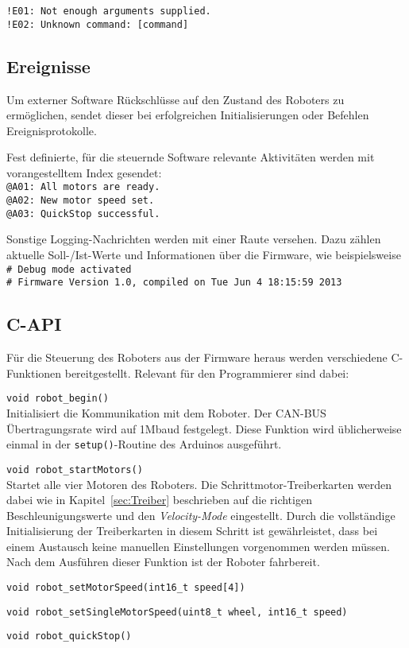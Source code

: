 \lstinline{!E01: Not enough arguments supplied.}\\
\lstinline{!E02: Unknown command: [command]}\\


\subsection{Ereignisse}
Um externer Software Rückschlüsse auf den Zustand des Roboters zu ermöglichen, sendet dieser bei erfolgreichen Initialisierungen oder Befehlen Ereignisprotokolle.

Fest definierte, für die steuernde Software relevante Aktivitäten werden mit vorangestelltem Index gesendet:\\
\lstinline{@A01: All motors are ready.}\\
\lstinline{@A02: New motor speed set.}\\
\lstinline{@A03: QuickStop successful.}

Sonstige Logging-Nachrichten werden mit einer Raute versehen.
Dazu zählen aktuelle Soll-/Ist-Werte und Informationen über die Firmware, wie beispielsweise\\
\lstinline{# Debug mode activated}\\
\lstinline{# Firmware Version 1.0, compiled on Tue Jun 4 18:15:59 2013}


\subsection{C-API}
Für die Steuerung des Roboters aus der Firmware heraus werden verschiedene C-Funktionen bereitgestellt. Relevant für den Programmierer sind dabei:

\begin{description}
\item \lstinline{void robot_begin()} \\
Initialisiert die Kommunikation mit dem Roboter. Der CAN-BUS Übertragungsrate wird auf 1Mbaud festgelegt. Diese Funktion wird üblicherweise einmal in der \lstinline{setup()}-Routine des Arduinos ausgeführt.

\item \lstinline{void robot_startMotors()} \\
Startet alle vier Motoren des Roboters.
Die Schrittmotor-Treiberkarten werden dabei wie in Kapitel~\ref{sec:Treiber} beschrieben auf die richtigen Beschleunigungswerte und den \emph{Velocity-Mode} eingestellt.
Durch die vollständige Initialisierung der Treiberkarten in diesem Schritt ist gewährleistet, dass bei einem Austausch keine manuellen Einstellungen vorgenommen werden müssen.
Nach dem Ausführen dieser Funktion ist der Roboter fahrbereit.

\item \lstinline{void robot_setMotorSpeed(int16_t speed[4])} \\
\item \lstinline{void robot_setSingleMotorSpeed(uint8_t wheel, int16_t speed)} \\
\item \lstinline{void robot_quickStop()} \\
\end{description}
